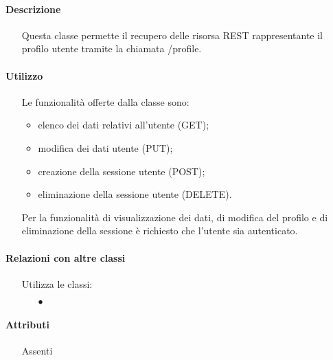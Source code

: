 \paragraph*{Descrizione}
\begin{itemize}
\item[] Questa classe permette il recupero delle risorsa REST rappresentante il profilo utente tramite la chiamata /profile.
\end{itemize}

\paragraph*{Utilizzo}
\begin{itemize}
\item[] Le funzionalità offerte dalla classe sono:
\begin{itemize}
\item elenco dei dati relativi all'utente (GET);
\item modifica dei dati utente (PUT);
\item creazione della sessione utente (POST);
\item eliminazione della sessione utente (DELETE).
\end{itemize}

Per la funzionalità di visualizzazione dei dati, di modifica del profilo e di eliminazione della sessione è richiesto che l'utente sia autenticato.
\end{itemize}

\paragraph*{Relazioni con altre classi}
\begin{itemize}


\item[] Utilizza le classi:
\begin{itemize}
\item[$\bullet$] 
\end{itemize}
\end{itemize}

\paragraph*{Attributi}
\begin{itemize}
\item[] Assenti
\end{itemize}

